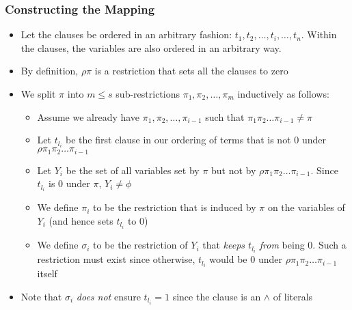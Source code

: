 \documentclass{beamer}[11pt]
\begin{document}
\begin{frame}
\frametitle{Constructing the Mapping}
\begin{itemize}
 \item Let the clauses be ordered in an arbitrary fashion: $t_1,t_2,\ldots,t_i,\ldots,t_n$. Within the clauses, the variables are also ordered in an arbitrary way.
 \item By definition, $\rho\pi$ is a restriction that sets all the clauses to zero
 \item We split $\pi$ into $m\leq s$ sub-restrictions $\pi_1,\pi_2,\ldots, \pi_m$ inductively as follows:
 \begin{itemize}
  \item Assume we already have $\pi_1,\pi_2,\ldots, \pi_{i-1}$ such that $\pi_1\pi_2\ldots \pi_{i-1} \neq \pi$
  \item Let $t_{l_i}$ be the first clause in our ordering of terms that is not 0 under $\rho\pi_1\pi_2\ldots \pi_{i-1}$
  \pause\item Let $Y_i$ be the set of all variables set by $\pi $ but not by $\rho\pi_1\pi_2\ldots \pi_{i-1}$. Since $t_{l_i}$ is 0 under $\pi$, $Y_i\neq \phi $
  \item We define $\pi_i$ to be the restriction that is induced by $\pi$ on the variables of $Y_i$ (and hence sets $t_{l_i} $ to 0)
  \item We define $\sigma_i$ to be the restriction of $Y_i$ that \emph{keeps $t_{l_i}$ from} being 0. Such a restriction must exist since otherwise, $t_{l_i}$ would be 0 under $\rho\pi_1\pi_2\ldots \pi_{i-1}$ itself
 \end{itemize}
 \item Note that $\sigma_i$ \emph{does not} ensure $t_{l_i} = 1$ since the clause is an $\wedge$ of literals
\end{itemize}

\end{frame}

\end{document}
